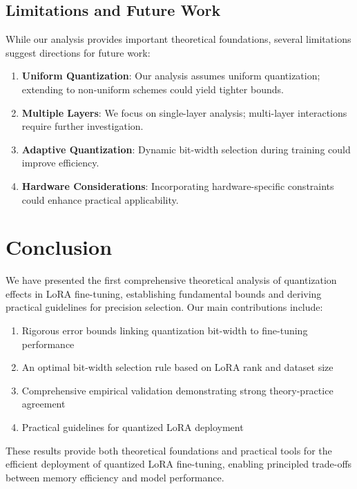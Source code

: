 \documentclass[10pt,twocolumn]{article}
\begin{document}
\subsection{Limitations and Future Work}

While our analysis provides important theoretical foundations, several limitations suggest directions for future work:

\begin{enumerate}
\item \textbf{Uniform Quantization}: Our analysis assumes uniform quantization; extending to non-uniform schemes could yield tighter bounds.

\item \textbf{Multiple Layers}: We focus on single-layer analysis; multi-layer interactions require further investigation.

\item \textbf{Adaptive Quantization}: Dynamic bit-width selection during training could improve efficiency.

\item \textbf{Hardware Considerations}: Incorporating hardware-specific constraints could enhance practical applicability.
\end{enumerate}

\section{Conclusion}

We have presented the first comprehensive theoretical analysis of quantization effects in LoRA fine-tuning, establishing fundamental bounds and deriving practical guidelines for precision selection. Our main contributions include:

\begin{enumerate}
\item Rigorous error bounds linking quantization bit-width to fine-tuning performance
\item An optimal bit-width selection rule based on LoRA rank and dataset size  
\item Comprehensive empirical validation demonstrating strong theory-practice agreement
\item Practical guidelines for quantized LoRA deployment
\end{enumerate}

These results provide both theoretical foundations and practical tools for the efficient deployment of quantized LoRA fine-tuning, enabling principled trade-offs between memory efficiency and model performance.
\end{document}
